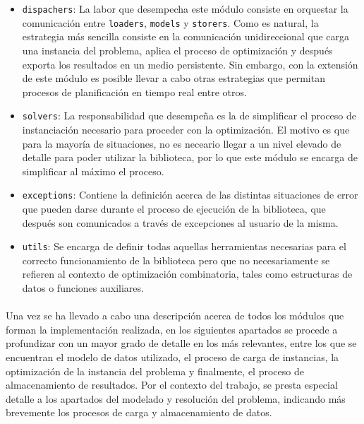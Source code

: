 \documentclass{subfiles}
\begin{document}
          \begin{itemize}
          
              \item \texttt{dispachers}: La labor que desempecha este módulo consiste en orquestar la comunicación entre \texttt{loaders}, \texttt{models} y \texttt{storers}. Como es natural, la estrategia más sencilla consiste en la comunicación unidireccional que carga una instancia del problema, aplica el proceso de optimización y después exporta los resultados en un medio persistente. Sin embargo, con la extensión de este módulo es posible llevar a cabo otras estrategias que permitan procesos de planificación en tiempo real entre otros.
            
            \item \texttt{solvers}: La responsabilidad que desempeña es la de simplificar el proceso de instanciación necesario para proceder con la optimización. El motivo es que para la mayoría de situaciones, no es neceario llegar a un nivel elevado de detalle para poder utilizar la biblioteca, por lo que este módulo se encarga de simplificar al máximo el proceso.
            
            \item \texttt{exceptions}: Contiene la definición acerca de las distintas situaciones de error que pueden darse durante el proceso de ejecución de la biblioteca, que después son comunicados a través de excepciones al usuario de la misma.
            
            \item \texttt{utils}: Se encarga de definir todas aquellas herramientas necesarias para el correcto funcionamiento de la biblioteca pero que no necesariamente se refieren al contexto de optimización combinatoria, tales como estructuras de datos o funciones auxiliares.
         
          \end{itemize}

          \paragraph{}
          Una vez se ha llevado a cabo una descripción acerca de todos los módulos que forman la implementación realizada, en los siguientes apartados se procede a profundizar con un mayor grado de detalle en los más relevantes, entre los que se encuentran el modelo de datos utilizado, el proceso de carga de instancias, la optimización de la instancia del problema y finalmente, el proceso de almacenamiento de resultados. Por el contexto del trabajo, se presta especial detalle a los apartados del modelado y resolución del problema, indicando más brevemente los procesos de carga y almacenamiento de datos.
     
\end{document}
